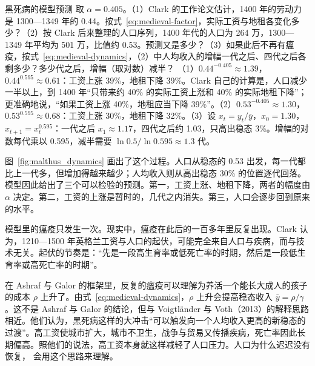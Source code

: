 \begin{example}{黑死病的模型预测}\label{ex:medieval-plague}
取 $\alpha=0.405$。（1）Clark 的工作论文估计，1400 年的劳动力是 1300—1349 年的 0.44\cite{clark1999wp}。按式~\eqref{eq:medieval-factor}，实际工资与地租各变化多少？（2）按 Clark 后来整理的人口序列，1400 年代的人口为 264 万，1300—1349 年平均为 501 万，比值约 0.53。预测又是多少？（3）如果此后不再有瘟疫，按式~\eqref{eq:medieval-dynamics}，（2）中人均收入的增幅一代之后、四代之后各剩多少？多少代之后，增幅（取对数）减半？
\solution （1）$0.44^{-0.405}\approx1.39$，$0.44^{0.595}\approx0.61$：工资上涨 39\%，地租下降 39\%。Clark 自己的计算是，人口减少一半以上，到 1400 年“只带来约 40\% 的实际工资上涨和 40\% 的实际地租下降”；更准确地说，“如果工资上涨 40\%，地租应当下降 39\%”\cite{clark1999wp}。（2）$0.53^{-0.405}\approx1.30$，$0.53^{0.595}\approx0.68$：工资上涨 30\%，地租下降 32\%。（3）设 $x_t=y_t/\bar y$，$x_0=1.30$，$x_{t+1}=x_t^{0.595}$：一代之后 $x_1\approx1.17$，四代之后约 1.03，只高出稳态 3\%。增幅的对数每代乘以 0.595，减半需要 $\ln0.5/\ln0.595\approx1.3$ 代。
\end{example}

图~\ref{fig:malthus_dynamics} 画出了这个过程。人口从稳态的 0.53 出发，每一代都比上一代多，但增加得越来越少；人均收入则从高出稳态 30\% 的位置逐代回落。模型因此给出了三个可以检验的预测。第一，工资上涨、地租下降，两者的幅度由 $\alpha$ 决定。第二，工资的上涨是暂时的，几代之内消失。第三，人口会逐步回到原来的水平。


模型里的瘟疫只发生一次。现实中，瘟疫在此后的一百多年里反复出现。Clark 认为，1210—1500 年英格兰工资与人口的起伏，可能完全来自人口与疾病，而与技术无关。起伏的节奏是：“先是一段高生育率或低死亡率的时期，然后是一段低生育率或高死亡率的时期”\cite{clark1999wp}。

在 Ashraf 与 Galor 的框架里，反复的瘟疫可以理解为养活一个能长大成人的孩子的成本 $\rho$ 上升了。由式~\eqref{eq:medieval-dynamics}，$\rho$ 上升会提高稳态收入 $\bar y=\rho/\gamma$。这不是 Ashraf 与 Galor 的结论，但与 Voigtländer 与 Voth（2013）的解释思路相近。他们认为，黑死病这样的大冲击“可以触发向一个人均收入更高的新稳态的过渡”。高工资使城市扩大，城市不卫生，战争与贸易又传播疾病，死亡率因此长期偏高。照他们的说法，高工资本身就这样减轻了人口压力\cite{vv2013}。人口为什么迟迟没有恢复， 会用这个思路来理解。

